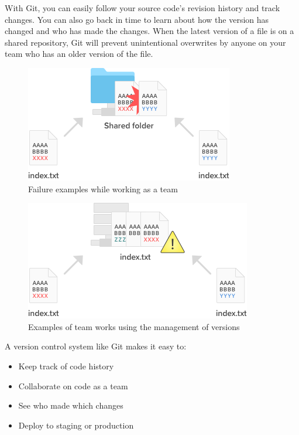 \documentclass[10pt,a4paper,english]{report}
\begin{document}
    With Git, you can easily follow your source code's revision history and track changes. You can also go back in time to learn about how the version has changed and who has made the changes. When the latest version of a file is on a shared repository, Git will prevent unintentional overwrites by anyone on your team who has an older version of the file.

    \begin{figure}[ht]
    \begin{center}
    \includegraphics[scale=0.5]{images/what_is_git_002.png}
    \end{center}
    \caption{Failure examples while working as a team}
    \end{figure}

    \begin{figure}[ht]
    \begin{center}
    \includegraphics[scale=0.5]{images/what_is_git_003.png}
    \end{center}
    \caption{Examples of team works using the management of versions}
    \end{figure}

    A version control system like Git makes it easy to:
    \begin{itemize}
        \item Keep track of code history
        \item Collaborate on code as a team
        \item See who made which changes
        \item Deploy to staging or production
    \end{itemize}
\end{document}
